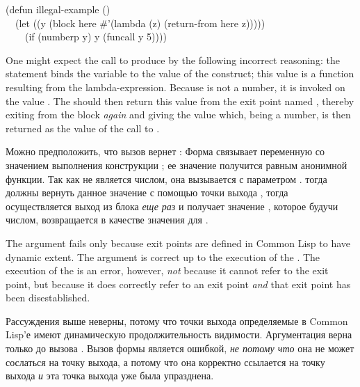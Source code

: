 \begin{lisp}
(defun illegal-example () \\
~~(let ((y (block here \#'(lambda (z) (return-from here z))))) \\
~~~~(if (numberp y) y (funcall y 5))))
\end{lisp}

One might expect the call  to produce 
by the following incorrect reasoning:
the  statement binds the variable  to the
value of the  construct; this value is a function resulting
from the lambda-expression.  Because  is not a number, it is
invoked on the value .  The  should then
return this value from the exit point named , thereby
exiting from the block \emph{again} and giving  the value 
which, being a number, is then returned as the value of the call
to .

Можно предположить, что вызов  вернет :
Форма  связывает переменную  со значением выполнения конструкции
; ее значение получится равным анонимной функции. Так как  не
является числом, она вызывается с параметром .  тогда
должны вернуть данное значение с помощью точки выхода , тогда
осуществляется выход из блока \emph{еще раз} и  получает значение ,
которое будучи числом, возвращается в качестве значения для .

The argument fails only because exit points are defined in Common Lisp
to have dynamic extent.  The argument is correct up to the execution
of the .  The execution of the  is
an error, however, \emph{not} because it cannot refer to the exit point,
but because it does correctly refer to an exit point \emph{and}
that exit point has been disestablished.

Рассуждения выше неверны, потому что точки выхода определяемые в
Common Lisp'е имеют динамическую продолжительность видимости. Аргументация верна
только до вызова . Вызов формы  является
ошибкой, \emph{не потому что} она не может сослаться на точку выхода, а потому
что она корректно ссылается на точку выхода \emph{и} эта точка выхода уже была
упразднена.